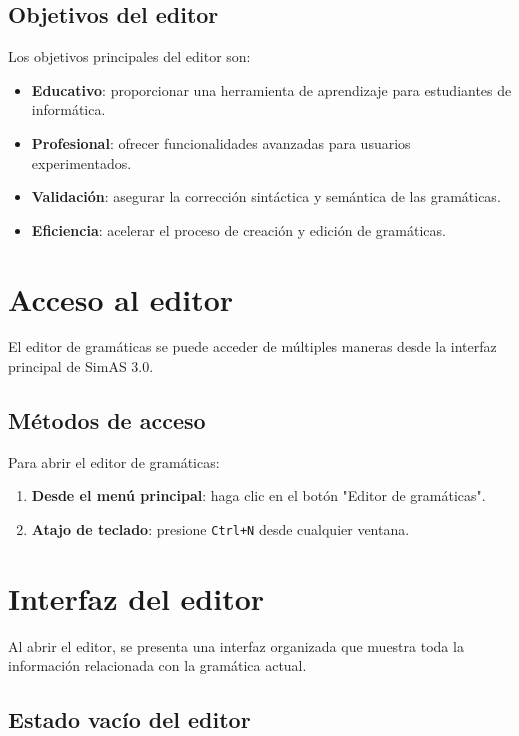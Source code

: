 \subsection{Objetivos del editor}

Los objetivos principales del editor son:

\begin{itemize}
    \item \textbf{Educativo}: proporcionar una herramienta de aprendizaje para estudiantes de informática.
    \item \textbf{Profesional}: ofrecer funcionalidades avanzadas para usuarios experimentados.
    \item \textbf{Validación}: asegurar la corrección sintáctica y semántica de las gramáticas.
    \item \textbf{Eficiencia}: acelerar el proceso de creación y edición de gramáticas.
\end{itemize}

\section{Acceso al editor}

El editor de gramáticas se puede acceder de múltiples maneras desde la interfaz principal de SimAS 3.0.

\subsection{Métodos de acceso}

Para abrir el editor de gramáticas:

\begin{enumerate}
    \item \textbf{Desde el menú principal}: haga clic en el botón \string"Editor de gramáticas\string".
    \item \textbf{Atajo de teclado}: presione \texttt{Ctrl+N} desde cualquier ventana.
\end{enumerate}

\section{Interfaz del editor}

Al abrir el editor, se presenta una interfaz organizada que muestra toda la información relacionada con la gramática actual.

\subsection{Estado vacío del editor}

